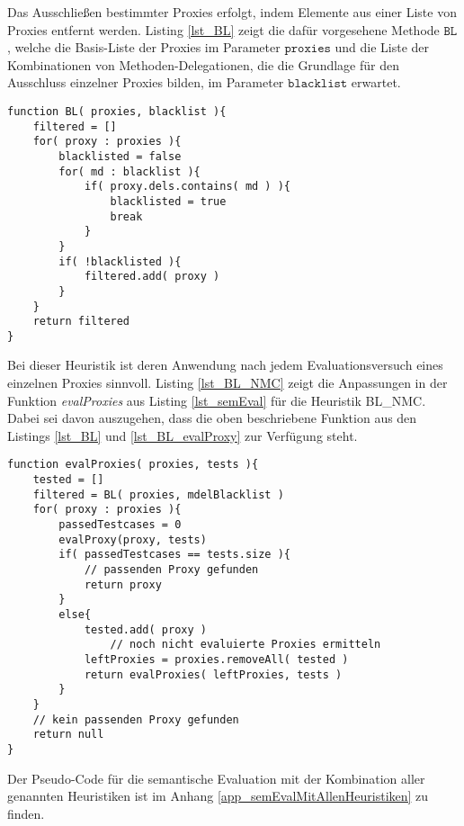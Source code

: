 \noindent
Das Ausschließen bestimmter Proxies erfolgt, indem Elemente aus einer Liste von Proxies entfernt werden. Listing \ref{lst_BL} zeigt die dafür vorgesehene Methode $\texttt{BL}$, welche die Basis-Liste der Proxies im Parameter $\texttt{proxies}$ und die Liste der Kombinationen von Methoden-Delegationen, die die Grundlage für den Ausschluss einzelner Proxies bilden, im Parameter $\texttt{blacklist}$ erwartet.
\begin{lstlisting}[style = pseudo, label = lst_BL, caption=Blacklist-Methode für Heuristil BL\_NMC, captionpos = b]
function BL( proxies, blacklist ){
	filtered = []	
	for( proxy : proxies ){
		blacklisted = false
		for( md : blacklist ){
			if( proxy.dels.contains( md ) ){
				blacklisted = true
				break
			}	
		}
		if( !blacklisted ){
			filtered.add( proxy )
		}
	}
	return filtered
}

\end{lstlisting}
\noindent
Bei dieser Heuristik ist deren Anwendung nach jedem Evaluationsversuch eines einzelnen Proxies sinnvoll. Listing \ref{lst_BL_NMC} zeigt die Anpassungen in der Funktion \emph{evalProxies} aus Listing \ref{lst_semEval} für die Heuristik BL\_NMC. Dabei sei davon auszugehen, dass die oben beschriebene Funktion aus den Listings \ref{lst_BL} und \ref{lst_BL_evalProxy} zur Verfügung steht.
\begin{lstlisting}[style = pseudo, caption=Evaluation mehrere Proxies mit BL\_MNC, captionpos=b, label = lst_BL_NMC]
function evalProxies( proxies, tests ){
	tested = []
	filtered = BL( proxies, mdelBlacklist )
	for( proxy : proxies ){
		passedTestcases = 0
		evalProxy(proxy, tests)
		if( passedTestcases == tests.size ){
			// passenden Proxy gefunden
			return proxy
		}
		else{
			tested.add( proxy )
				// noch nicht evaluierte Proxies ermitteln
			leftProxies = proxies.removeAll( tested )	
			return evalProxies( leftProxies, tests )
		}
	}
	// kein passenden Proxy gefunden
	return null
}
\end{lstlisting}
\noindent
Der Pseudo-Code für die semantische Evaluation mit der Kombination aller genannten Heuristiken ist im Anhang \ref{app_semEvalMitAllenHeuristiken} zu finden.


